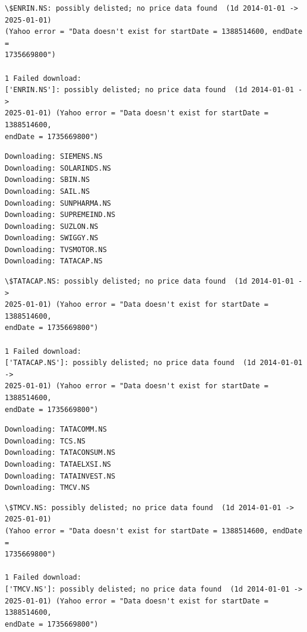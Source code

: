 \documentclass[11pt]{article}
\begin{document}
    \begin{Verbatim}[commandchars=\\\{\}]
\$ENRIN.NS: possibly delisted; no price data found  (1d 2014-01-01 -> 2025-01-01)
(Yahoo error = "Data doesn't exist for startDate = 1388514600, endDate =
1735669800")

1 Failed download:
['ENRIN.NS']: possibly delisted; no price data found  (1d 2014-01-01 ->
2025-01-01) (Yahoo error = "Data doesn't exist for startDate = 1388514600,
endDate = 1735669800")
    \end{Verbatim}

    \begin{Verbatim}[commandchars=\\\{\}]
Downloading: SIEMENS.NS
Downloading: SOLARINDS.NS
Downloading: SBIN.NS
Downloading: SAIL.NS
Downloading: SUNPHARMA.NS
Downloading: SUPREMEIND.NS
Downloading: SUZLON.NS
Downloading: SWIGGY.NS
Downloading: TVSMOTOR.NS
Downloading: TATACAP.NS
    \end{Verbatim}

    \begin{Verbatim}[commandchars=\\\{\}]
\$TATACAP.NS: possibly delisted; no price data found  (1d 2014-01-01 ->
2025-01-01) (Yahoo error = "Data doesn't exist for startDate = 1388514600,
endDate = 1735669800")

1 Failed download:
['TATACAP.NS']: possibly delisted; no price data found  (1d 2014-01-01 ->
2025-01-01) (Yahoo error = "Data doesn't exist for startDate = 1388514600,
endDate = 1735669800")
    \end{Verbatim}

    \begin{Verbatim}[commandchars=\\\{\}]
Downloading: TATACOMM.NS
Downloading: TCS.NS
Downloading: TATACONSUM.NS
Downloading: TATAELXSI.NS
Downloading: TATAINVEST.NS
Downloading: TMCV.NS
    \end{Verbatim}

    \begin{Verbatim}[commandchars=\\\{\}]
\$TMCV.NS: possibly delisted; no price data found  (1d 2014-01-01 -> 2025-01-01)
(Yahoo error = "Data doesn't exist for startDate = 1388514600, endDate =
1735669800")

1 Failed download:
['TMCV.NS']: possibly delisted; no price data found  (1d 2014-01-01 ->
2025-01-01) (Yahoo error = "Data doesn't exist for startDate = 1388514600,
endDate = 1735669800")
    \end{Verbatim}
\end{document}
